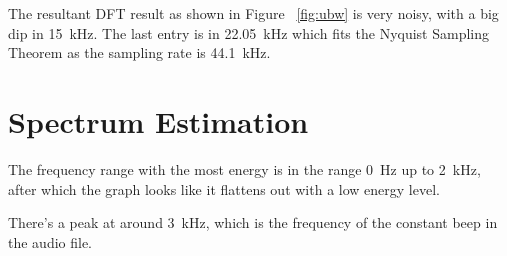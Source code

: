 \documentclass{article}
\begin{document}
The resultant DFT result as shown in Figure~ \ref{fig:ubw} is very noisy, with a big dip in \SI{15}{\kilo\hertz}. The last entry is in \SI{22.05}{\kilo\hertz} which fits the Nyquist Sampling Theorem as the sampling rate is \SI{44.1}{\kilo\hertz}.

\section{Spectrum Estimation}

The frequency range with the most energy is in the range \SI{0}{\hertz} up to \SI{2}{\kilo\hertz}, after which the graph looks like it flattens out with a low energy level.

There's a peak at around \SI{3}{\kilo\hertz}, which is the frequency of the constant beep in the audio file.
\end{document}
